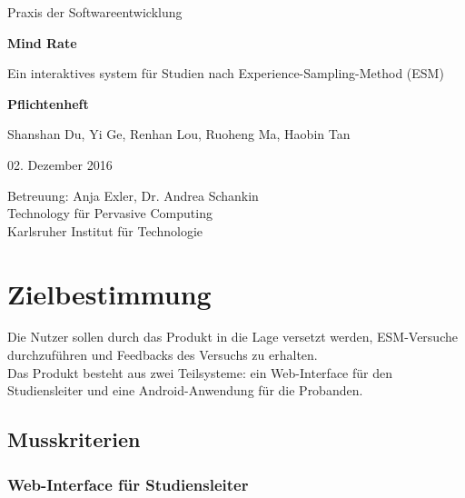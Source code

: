 \documentclass[a4paper]{scrreprt}
\begin{document}
    \begin{center} \large

        Praxis der Softwareentwicklung
        \vspace * {1.5cm}

        \textbf{\huge Mind Rate}

        \vspace*{1cm}

        {\Large Ein interaktives system f\"ur Studien nach Experience-Sampling-Method (ESM)}

        \vspace*{1cm}

        \textbf{\Large Pflichtenheft}
        \vspace*{2cm}

        Shanshan Du, Yi Ge, Renhan Lou, Ruoheng Ma, Haobin Tan
        \vspace*{1cm}

        02. Dezember 2016
        \vspace*{2.5cm}


        Betreuung: Anja Exler, Dr. Andrea Schankin\\[1cm]
        Technology f\"ur Pervasive Computing\\[0.5cm]
        Karlsruher Institut für Technologie
    \end{center}
    \thispagestyle{empty}

    \tableofcontents

    \chapter{Zielbestimmung}
        Die Nutzer sollen durch das Produkt in die Lage versetzt werden, ESM-Versuche durchzuführen und Feedbacks des Versuchs zu erhalten.\\

        \noindent Das Produkt besteht aus zwei Teilsysteme: ein \gls{Web-Interface} für den \gls{Studiensleiter} und eine Android-Anwendung für die \gls{Proband}en.


        \section{Musskriterien}
            \subsection{\gls{Web-Interface} für \gls{Studiensleiter}}
            
\end{document}
